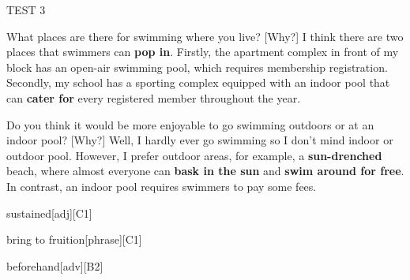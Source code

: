 \begin{glossarymc}[Cambridge 15]
\begin{test}{TEST 3}
    \begin{qa}{What places are there for swimming where you live? [Why?]}
    I think there are two places that swimmers can \textbf{pop in}. Firstly, the apartment complex in front of my block has an open-air swimming pool, which requires membership registration. Secondly, my school has a sporting complex equipped with an indoor pool that can \textbf{cater for} every registered member throughout the year.
    \end{qa}

    \begin{qa}{Do you think it would be more enjoyable to go swimming outdoors or at an indoor pool? [Why?]}
    Well, I hardly ever go swimming so I don’t mind indoor or outdoor pool. However, I prefer outdoor areas, for example, a \textbf{sun-drenched} beach, where almost everyone can \textbf{bask in the sun} and \textbf{swim around for free}. In contrast, an indoor pool requires swimmers to pay some fees.
    \end{qa}

        \begin{VocabExplain}[Part 1]
            \begin{ExplainCard}{sustained}[adj][C1]
            \end{ExplainCard}

            \begin{ExplainCard}{bring to fruition}[phrase][C1]
            \end{ExplainCard}

            \begin{ExplainCard}{beforehand}[adv][B2]
            \end{ExplainCard}


\end{VocabExplain}
\end{test}
\end{glossarymc}
